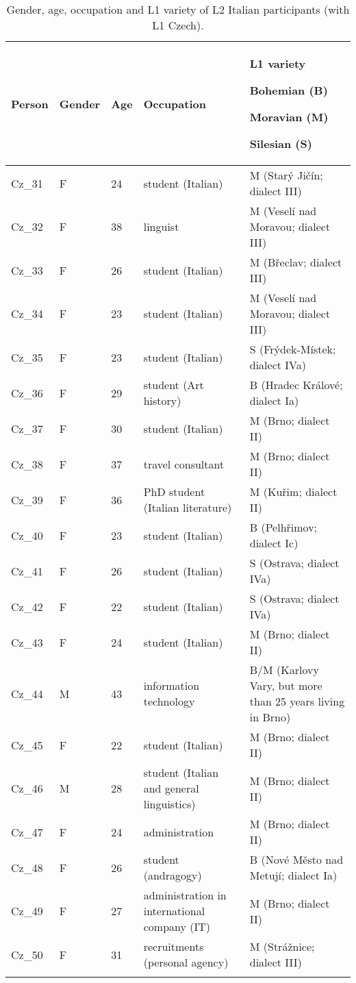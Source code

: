 \begin{table}[p]
\small
\begin{tabularx}{\textwidth}{lllQQ}

\lsptoprule

{Person} & {Gender} & {Age} & {Occupation} & {L1 variety}

{Bohemian (B)}

{Moravian (M)}

{Silesian (S)}\\
\midrule
Cz\_31 & F & 24 & student (Italian) & M (Starý Jičín; dialect III)\\
Cz\_32 & F & 38 & linguist & M (Veselí nad Moravou; dialect III)\\
Cz\_33 & F & 26 & student (Italian) & M (Břeclav; dialect III)\\
Cz\_34 & F & 23 & student (Italian) & M (Veselí nad Moravou; dialect III)\\
Cz\_35 & F & 23 & student (Italian) & S (Frýdek-Místek; dialect IVa)\\
Cz\_36 & F & 29 & student (Art history) & B (Hradec Králové; dialect Ia)\\
Cz\_37 & F & 30 & student (Italian) & M (Brno; dialect II)\\
Cz\_38 & F & 37 & travel consultant & M (Brno; dialect II)\\
Cz\_39 & F & 36 & PhD student (Italian literature) & M (Kuřim; dialect II)\\
Cz\_40 & F & 23 & student (Italian) & B (Pelhřimov; dialect Ic)\\
Cz\_41 & F & 26 & student (Italian) & S (Ostrava; dialect IVa)\\
Cz\_42 & F & 22 & student (Italian) & S (Ostrava; dialect IVa)\\
Cz\_43 & F & 24 & student (Italian) & M (Brno; dialect II)\\
Cz\_44 & M & 43 & information technology & B/M (Karlovy Vary, but more than 25 years living in Brno)\\
Cz\_45 & F & 22 & student (Italian) & M (Brno; dialect II)\\
Cz\_46 & M & 28 & student (Italian and general linguistics) & M (Brno; dialect II)\\
Cz\_47 & F & 24 & administration & M (Brno; dialect II)\\
Cz\_48 & F & 26 & student (andragogy) & B (Nové Město nad Metují; dialect Ia)\\
Cz\_49 & F & 27 & administration in international company (IT) & M (Brno; dialect II)\\
Cz\_50 & F & 31 & recruitments (personal agency) & M (Strážnice; dialect III)\\
\lspbottomrule
\end{tabularx}

\caption{\label{tab:3.6}Gender, age, occupation and L1 variety of L2 Italian participants (with L1 Czech).}
\end{table}


